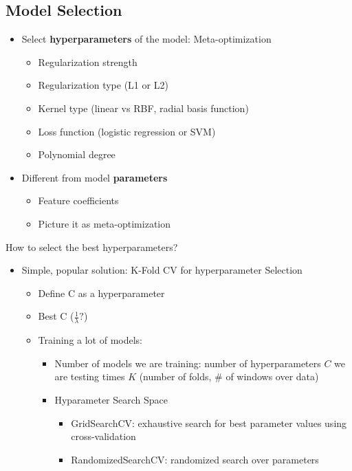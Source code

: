 \documentclass[10pt, oneside]{article}
\begin{document}
\subsection{Model Selection}
\begin{itemize}
    \item Select \textbf{hyperparameters} of the model: Meta-optimization
    \begin{itemize}
        \item Regularization strength
        \item Regularization type (L1 or L2)
        \item Kernel type (linear vs RBF, radial basis function)
        \item Loss function (logistic regression or SVM)
        \item Polynomial degree
    \end{itemize}
    \item Different from model \textbf{parameters}
    \begin{itemize}
        \item Feature coefficients
        \item Picture it as meta-optimization
    \end{itemize}
\end{itemize}
How to select the best hyperparameters?
\begin{itemize}
    \item Simple, popular solution: K-Fold CV for hyperparameter Selection
    \begin{itemize}
        \item Define C as a hyperparameter
        \item Best C ($\frac{1}{\lambda}?$)
        \item Training a lot of models:
        \begin{itemize}
            \item Number of models we are training: number of hyperparameters $C$ we are testing times $K$ (number of folds, \# of windows over data)
            \item Hyparameter Search Space
            \begin{itemize}
                \item GridSearchCV: exhaustive search for best parameter values using cross-validation
                \item RandomizedSearchCV: randomized search over parameters
            \end{itemize}
        \end{itemize}
    \end{itemize}
\end{itemize}
\end{document}
